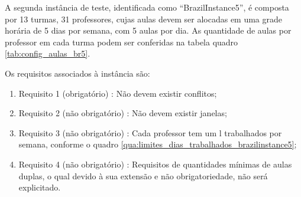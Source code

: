 A segunda instância de teste, identificada como ``BrazilInstance5'', é composta por 13 turmas, 31 professores, cujas aulas devem ser alocadas em uma grade horária de 5 dias por semana, com 5 aulas por dia. As quantidade de aulas por professor em cada turma podem ser conferidas na tabela quadro \ref{tab:config_aulas_br5}.



\newpage
Os requisitos associados à instância são:
\begin{enumerate}
	\item Requisito 1 (obrigatório) : Não devem existir conflitos;
	\item Requisito 2 (não obrigatório) : Não devem existir janelas;
	\item Requisito 3 (não obrigatório) : Cada professor tem um l trabalhados por semana, conforme o quadro \ref{qua:limites_dias_trabalhados_brazilinstance5};
	\item Requisito 4 (não obrigatório) : Requisitos de quantidades mínimas de aulas duplas, o qual devido à sua extensão e não obrigatoriedade, não será explicitado.
\end{enumerate}

